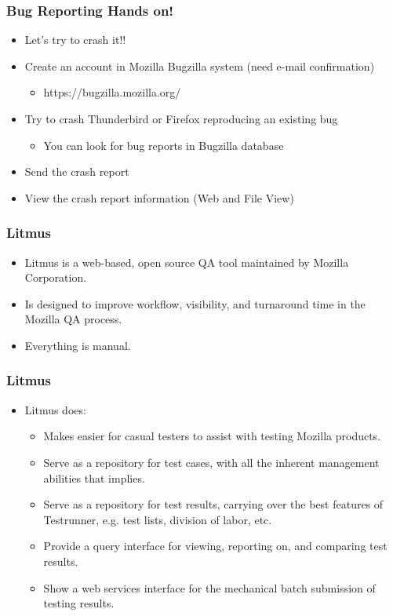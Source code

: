 \documentclass{beamer}
\begin{document}
\begin{frame}
 \frametitle{Bug Reporting Hands on!}
 \begin{itemize}
    \item Let's try to crash it!! 
    \item Create an account in Mozilla Bugzilla system (need e-mail confirmation)
        \begin{itemize}
        \item https://bugzilla.mozilla.org/
        \end{itemize}
    \item Try to crash Thunderbird or Firefox reproducing an existing bug
        \begin{itemize}
        \item You can look for bug reports in Bugzilla database
        \end{itemize}
    \item Send the crash report
    \item View the crash report information (Web and File View)
 \end{itemize}
\end{frame}



\begin{frame}
\frametitle{Litmus}
 \begin{itemize}
    \item Litmus is a web-based, open source QA tool maintained by Mozilla Corporation.
    \item Is designed to improve workflow, visibility, and turnaround time in the Mozilla QA process.
    \item Everything is manual.
 \end{itemize}

\end{frame}

\begin{frame}
\frametitle{Litmus}
 \begin{itemize}
    \item Litmus does:
       \begin{itemize}
       \item Makes easier for casual testers to assist with testing Mozilla products.
       \item Serve as a repository for test cases, with all the inherent management abilities that implies.
       \item Serve as a repository for test results, carrying over the best features of Testrunner, e.g. test lists, division of labor, etc.
       \item Provide a query interface for viewing, reporting on, and comparing test results.
       \item Show a web services interface for the mechanical batch submission of testing results.
       \end{itemize}
 \end{itemize}
\end{frame}
\end{document}
